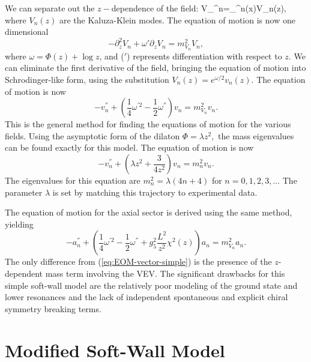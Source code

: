 We can separate out the $z-$dependence of the field: 
\be 
V_{\mu}^{n}=_{\mu}^{n}(x)V_{n}(z), 
\ee
where $V_{n}(z)$ are the Kaluza-Klein modes. 
The equation of motion is now one dimensional
\begin{equation}
-\partial_{z}^{2}V_{n}+\omega'\partial_{z}V_{n}=m_{V_{n}}^{2}V_{n},
\label{eq:vectorEOM1}
\end{equation}
where $\omega=\Phi(z)+\log z$, and ($'$) represents differentiation with respect to $z$. 
We can eliminate the first derivative of the field, bringing the equation of motion into Schrodinger-like form, using the substitution $V_{n}(z)=e^{\omega/2}v_{n}(z)$.
The equation of motion is now
\begin{equation}
-v_{n}^{''}+\left(\frac{1}{4}\omega^{'2}-\frac{1}{2}\omega^{''}\right)v_{n}=m_{V_{n}}^{2}v_{n}.\label{eq:EOM-vector-simple}
\end{equation}
This is the general method for finding the equations of motion for the various fields. 
Using the asymptotic form of the dilaton $\Phi=\lambda z^{2},$ the mass eigenvalues can be found exactly for this model. The equation of motion is now
\begin{equation}
-v_{n}^{''}+\left(\lambda z^{2}+\frac{3}{4z^{2}}\right)v_{n}=m_{n}^{2}v_{n}.
\end{equation}
The eigenvalues for this equation are $m_{n}^{2}=\lambda(4n+4)$ for $n=0,1,2,3,\dots$ 
The parameter $\lambda$ is set by matching this trajectory to experimental data. 

The equation of motion for the axial sector is derived using the same method, yielding
\begin{equation}
-a_{n}^{''}+\left(\frac{1}{4}\omega^{'2}-\frac{1}{2}\omega^{''}+g_{5}^{2}\frac{L^{2}}{z^{2}}\chi^{2}(z)\right)a_{n}=m_{V_{n}}^{2}a_{n}.\label{eq:EOM-axial-simple}
\end{equation}
The only difference from (\ref{eq:EOM-vector-simple}) is the presence of the $z$-dependent mass term involving the VEV. 
The significant drawbacks for this simple soft-wall model are the relatively poor modeling of the ground state and lower resonances and the lack of independent spontaneous and explicit chiral symmetry
breaking terms.


\section{Modified Soft-Wall Model\label{sub:Modified-Soft-Wall-Model}}

